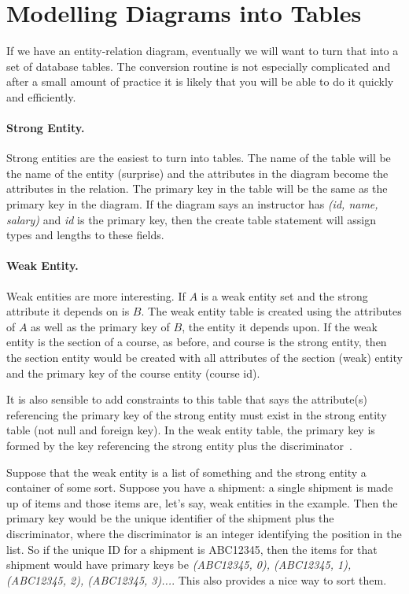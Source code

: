 




\section*{Modelling Diagrams into Tables}
If we have an entity-relation diagram, eventually we will want to turn that into a set of database tables. The conversion routine is not especially complicated and after a small amount of practice it is likely that you will be able to do it quickly and efficiently.

\paragraph{Strong Entity.} Strong entities are the easiest to turn into tables. The name of the table will be the name of the entity (surprise) and the attributes in the diagram become the attributes in the relation. The primary key in the table will be the same as the primary key in the diagram. If the diagram says an instructor has \textit{(id, name, salary)} and \textit{id} is the primary key, then the create table statement will assign types and lengths to these fields. 

\paragraph{Weak Entity.} Weak entities are more interesting. If $A$ is a weak entity set and the strong attribute it depends on is $B$. The weak entity table is created using the attributes of $A$ as well as the primary key of $B$, the entity it depends upon. If the weak entity is the section of a course, as before, and course is the strong entity, then the section entity would be created with all attributes of the section (weak) entity and the primary key  of the course entity (course id).

It is also sensible to add constraints to this table that says the attribute(s) referencing the primary key of the strong entity  must exist in the strong entity table (not null and foreign key). In the weak entity table, the primary key is formed by the key referencing the strong entity plus the discriminator~\cite{dsc}.

Suppose that the weak entity is a list of something and the strong entity a container of some sort. Suppose you have a shipment: a single shipment is made up of items and those items are, let's say, weak entities in the example. Then the primary key would be the unique identifier of the shipment plus the discriminator, where the discriminator is an integer identifying the position in the list. So if the unique ID for a shipment is ABC12345, then the items for that shipment would have primary keys be \textit{(ABC12345, 0), (ABC12345, 1), (ABC12345, 2), (ABC12345, 3)...}. This also provides a nice way to sort them.

